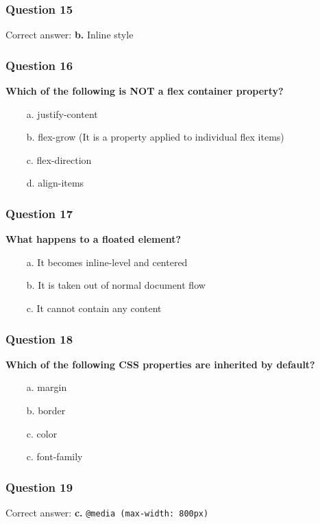 \documentclass{article}
\newcommand{\cmark}{\textcolor{green}{\ding{51}}} %
\newcommand{\xmark}{\textcolor{red}{\ding{55}}}   %
\begin{document}
\subsubsection*{Question 15}
Correct answer: \textbf{b.} Inline style

\subsubsection*{Question 16}
\textbf{Which of the following is NOT a flex container property?}
\begin{itemize}
  \item[\xmark\ a.] justify-content
  \item[\cmark\ b.] flex-grow (It is a property applied to individual flex items)
  \item[\xmark\ c.] flex-direction
  \item[\xmark\ d.] align-items
\end{itemize}

\subsubsection*{Question 17}
\textbf{What happens to a floated element?}
\begin{itemize}
  \item[\xmark\ a.] It becomes inline-level and centered
  \item[\cmark\ b.] It is taken out of normal document flow
  \item[\xmark\ c.] It cannot contain any content
\end{itemize}

\subsubsection*{Question 18}
\textbf{Which of the following CSS properties are inherited by default?}
\begin{itemize}
  \item[\xmark\ a.] margin
  \item[\xmark\ b.] border
  \item[\cmark\ c.] color
  \item[\cmark\ c.] font-family
\end{itemize}

\subsubsection*{Question 19}
Correct answer: \textbf{c.} \texttt{@media (max-width: 800px)}
\end{document}
